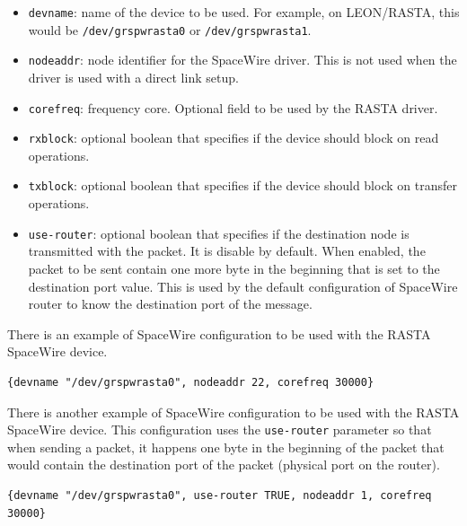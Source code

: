 \documentclass[11pt]{book}
\begin{document}
\begin{itemize}
         \begin{itemize}
            \item
               \texttt{devname}: name of the device to be used. For example, on
               LEON/RASTA, this would be \texttt{/dev/grspwrasta0} or
               \texttt{/dev/grspwrasta1}.
            \item
               \texttt{nodeaddr}: node identifier for the SpaceWire driver. This
               is not used when the driver is used with a direct link setup.
            \item
               \texttt{corefreq}: frequency core. Optional field to be used by
               the RASTA driver.
            \item
               \texttt{rxblock}: optional boolean that specifies if the device
               should block on read operations.
            \item
               \texttt{txblock}: optional boolean that specifies if the device
               should block on transfer operations.
            \item
               \texttt{use-router}: optional boolean that specifies if the
               destination node is transmitted with the packet. It is disable by
               default. When enabled, the packet to be sent contain one more
               byte in the beginning that is set to the destination port value.
               This is used by the default configuration of SpaceWire router to
               know the destination port of the message.
         \end{itemize}

       There is an example of SpaceWire configuration to be used with
       the RASTA SpaceWire device.
\begin{lstlisting}[frame=single]
{devname "/dev/grspwrasta0", nodeaddr 22, corefreq 30000}
\end{lstlisting}


       There is another example of SpaceWire configuration to be used with
       the RASTA SpaceWire device. This configuration uses the
       \texttt{use-router} parameter so that when sending a packet, it happens
       one byte in the beginning of the packet that would contain the
       destination port of the packet (physical port on the router).

\begin{lstlisting}[frame=single]
{devname "/dev/grspwrasta0", use-router TRUE, nodeaddr 1, corefreq 30000}
\end{lstlisting}



\end{itemize}
\end{document}
